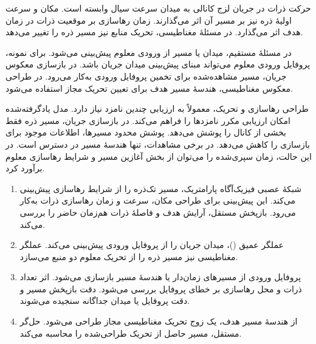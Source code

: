 \label{ch:introduction}

\nocite{knuth1984texbook,lamport1985LaTeX}


حرکت ذرات در جریان لزج کانالی به میدان سرعت سیال وابسته است.
مکان و سرعت اولیهٔ ذره نیز بر مسیر آن اثر می‌گذارند.
زمان رهاسازی بر موقعیت ذرات در زمان هدف اثر می‌گذارد.
در مسئلهٔ مغناطیسی، تحریک منابع نیز مسیر ذره را تغییر می‌دهد.

در مسئلهٔ مستقیم، میدان یا مسیر از ورودی معلوم پیش‌بینی می‌شود.
برای نمونه، پروفایل ورودی معلوم می‌تواند مبنای پیش‌بینی میدان جریان باشد.
در بازسازی معکوس جریان، مسیر مشاهده‌شده برای تخمین پروفایل ورودی به‌کار می‌رود.
در طراحی معکوس مغناطیسی، هندسهٔ مسیر هدف برای تعیین تحریک مجاز استفاده می‌شود.

طراحی رهاسازی و تحریک، معمولاً به ارزیابی چندین نامزد نیاز دارد.
مدل یادگرفته‌شده امکان ارزیابی مکرر نامزدها را فراهم می‌کند.
در بازسازی جریان، مسیر ذره فقط بخشی از کانال را پوشش می‌دهد.
پوشش محدود مسیرها، اطلاعات موجود برای بازسازی را کاهش می‌دهد.
در برخی مشاهدات، تنها هندسهٔ مسیر در دسترس است.
در این حالت، زمان سپری‌شده را می‌توان از بخش آغازین مسیر و شرایط رهاسازی معلوم برآورد کرد.


\begin{enumerate}
\item
شبکهٔ عصبی فیزیک‌آگاه پارامتریک، مسیر تک‌ذره را از شرایط رهاسازی پیش‌بینی می‌کند.
این پیش‌بینی برای طراحی مکان، سرعت و زمان رهاسازی ذرات به‌کار می‌رود.
بازپخش مستقل، آرایش هدف و فاصلهٔ ذرات هم‌زمان حاضر را بررسی می‌کند.

\item
عملگر عمیق ()، میدان جریان را از پروفایل ورودی پیش‌بینی می‌کند.
عملگر مغناطیسی نیز مسیر ذره را از تحریک معلوم دو منبع می‌سازد.

\item
پروفایل ورودی از مسیرهای زمان‌دار یا هندسهٔ مسیر بازسازی می‌شود.
اثر تعداد ذرات و محل رهاسازی بر خطای پروفایل بررسی می‌شود.
دقت بازپخش مسیر و دقت پروفایل یا میدان جداگانه سنجیده می‌شوند.

\item
از هندسهٔ مسیر هدف، یک زوج تحریک مغناطیسی مجاز طراحی می‌شود.
حل‌گر مستقل، مسیر حاصل از تحریک طراحی‌شده را محاسبه می‌کند.
\end{enumerate}


